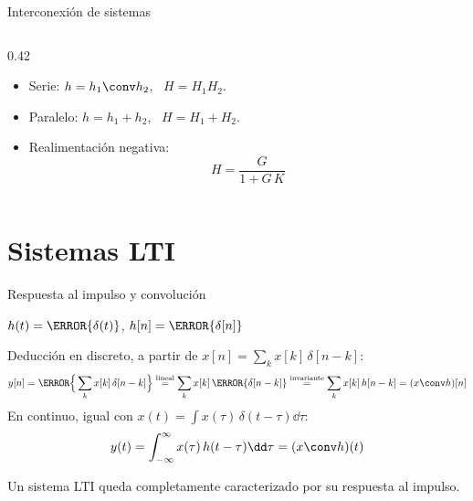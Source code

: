 \documentclass[aspectratio=169,11pt]{beamer}
\begin{document}
\begin{frame}{Interconexión de sistemas}
\begin{columns}[c]
\begin{column}{0.42\textwidth}
      \begin{itemize}\small
        \item Serie: $h=h_1\conv h_2$, \ $H=H_1H_2$.\\
        \item Paralelo: $h=h_1+h_2$, \ $H=H_1+H_2$.
        \item Realimentación negativa:
          \[H=\frac{G}{1+G\,K}\]
      \end{itemize}
    \end{column}
  \end{columns}
\end{frame}

\section{Sistemas LTI}

\begin{frame}{Respuesta al impulso y convolución}
  \begin{definicion}
    $h(t)=\T\{\delta(t)\}$, \qquad $h[n]=\T\{\delta[n]\}$
  \end{definicion}
  \alert{Deducción en discreto}, a partir de $x[n]=\sum_k x[k]\,\delta[n-k]$:
  \[
    y[n]=\T\Big\{\sum_k x[k]\,\delta[n-k]\Big\}
    \overset{\text{lineal}}{=}\sum_k x[k]\,\T\{\delta[n-k]\}
    \overset{\text{invariante}}{=}\sum_k x[k]\,h[n-k]=(x\conv h)[n]
  \]
  En continuo, igual con $x(t)=\int x(\tau)\,\delta(t-\tau)\dd\tau$:
  \[
    y(t)=\int_{-\infty}^{\infty}x(\tau)\,h(t-\tau)\dd\tau=(x\conv h)(t)
  \]
  \begin{importante}[Consecuencia]
    Un sistema LTI queda \alert{completamente caracterizado} por su respuesta al impulso.
  \end{importante}
\end{frame}
\end{document}
